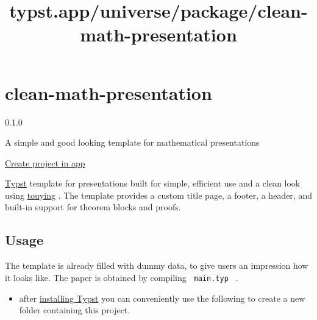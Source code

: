 \title{typst.app/universe/package/clean-math-presentation}

\label{banner}
\label{template-thumbnail}

\section{clean-math-presentation}\label{clean-math-presentation}

{ 0.1.0 }

A simple and good looking template for mathematical presentations

\href{/app?template=clean-math-presentation&version=0.1.0}{Create
project in app}

\label{readme}
\href{https://github.com/JoshuaLampert/clean-math-presentation/actions/workflows/build.yml}{\pandocbounded{}}
\href{https://github.com/JoshuaLampert/clean-math-presentation}{}
\href{https://opensource.org/licenses/MIT}{\pandocbounded{}}

\href{https://typst.app/home/}{Typst} template for presentations built
for simple, efficient use and a clean look using
\href{https://touying-typ.github.io/}{touying} . The template provides a
custom title page, a footer, a header, and built-in support for theorem
blocks and proofs.

\subsection{Usage}\label{usage}

The template is already filled with dummy data, to give users an
impression how it looks like. The paper is obtained by compiling
\texttt{\ main.typ\ } .

\begin{itemize}
\tightlist
\item
  after
  \href{https://github.com/typst/typst?tab=readme-ov-file\#installation}{installing
  Typst} you can conveniently use the following to create a new folder
  containing this project.
\end{itemize}


